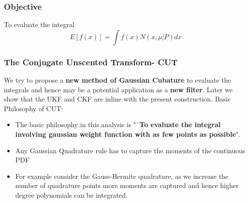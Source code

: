\documentclass[11pt]{beamer}
\begin{document}
\begin{frame}

\frametitle{Objective}
\begin{block}{To evaluate the integral}
\large
\begin{equation*}
E[f(x)]=\int{f(x)N(x,\mu|P)}dx
\end{equation*}
\end{block}
\end{frame}
\begin{frame}
\frametitle{The Conjugate Unscented Transform- CUT}
We try to propose a {\bf new method of Gaussian Cubature} to evaluate the integrals and hence may be a potential application as a {\bf new filter}. Later we show that the UKF and CKF are inline with the present construction.  
Basic Philosophy of CUT:\newline
\begin{itemize}[<+->]
\item The basic philosophy in this analysis is "`{\bf To evaluate the integral involving gaussian weight function with as few points as possible}".
\item Any Gaussian Quadrature rule has to capture the moments of the continuous PDF
\item For example consider the Gauss-Hermite quadrature, as we increase the number of quadrature points more moments are captured and hence higher degree polynomials can be integrated.
\end{itemize}
\end{frame}

\end{document}
